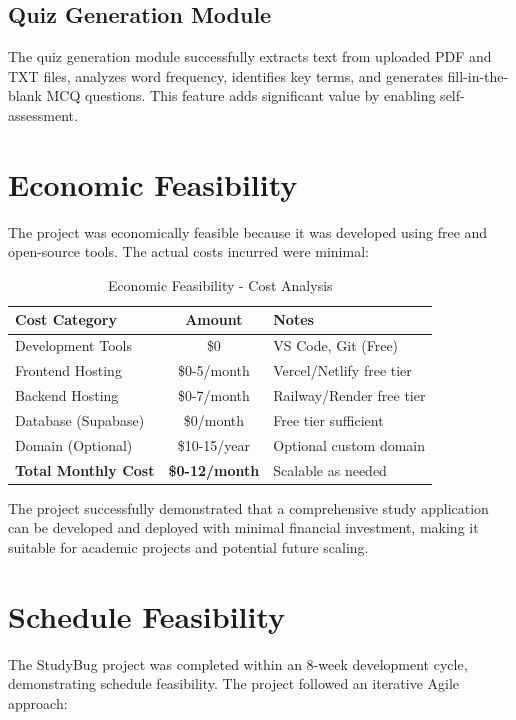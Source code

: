             \subsection{Quiz Generation Module}
                The quiz generation module successfully extracts text from uploaded PDF and TXT files, analyzes word frequency, identifies key terms, and generates fill-in-the-blank MCQ questions. This feature adds significant value by enabling self-assessment.

        \section{Economic Feasibility}
            The project was economically feasible because it was developed using free and open-source tools. The actual costs incurred were minimal:

            \begin{table}[h]
            \centering
            \begin{tabular}{|l|c|l|}
            \hline
            \textbf{Cost Category} & \textbf{Amount} & \textbf{Notes} \\
            \hline
            Development Tools & \$0 & VS Code, Git (Free) \\
            Frontend Hosting & \$0-5/month & Vercel/Netlify free tier \\
            Backend Hosting & \$0-7/month & Railway/Render free tier \\
            Database (Supabase) & \$0/month & Free tier sufficient \\
            Domain (Optional) & \$10-15/year & Optional custom domain \\
            \hline
            \textbf{Total Monthly Cost} & \textbf{\$0-12/month} & Scalable as needed \\
            \hline
            \end{tabular}
            \caption{Economic Feasibility - Cost Analysis}
            \end{table}

            The project successfully demonstrated that a comprehensive study application can be developed and deployed with minimal financial investment, making it suitable for academic projects and potential future scaling.

        \section{Schedule Feasibility}
            The StudyBug project was completed within an 8-week development cycle, demonstrating schedule feasibility. The project followed an iterative Agile approach:

